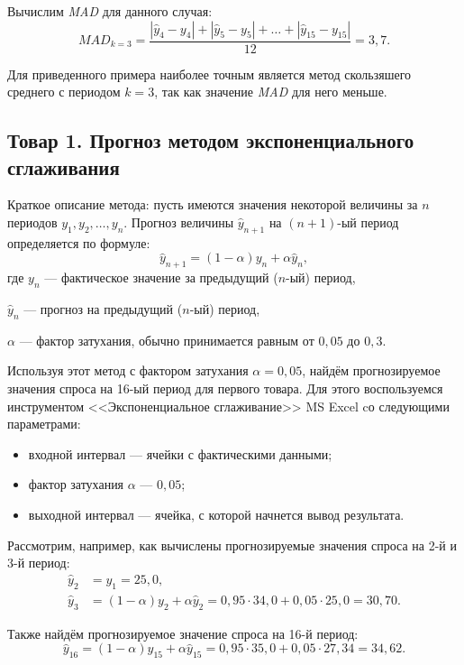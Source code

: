 Вычислим \textit{MAD} для данного случая:
\[
  MAD_{k=3} = \dfrac{|\hat{y}_4 - y_4| + |\hat{y}_5 - y_5| + \dots + |\hat{y}_{15} - y_{15}|}{12} = 3{,}7.
\]

Для приведенного примера наиболее точным является метод скользяшего среднего
с периодом $k = 3$, так как значение \textit{MAD} для него меньше.


\subsection{Товар 1. Прогноз методом экспоненциального сглаживания}

Краткое описание метода: пусть имеются значения некоторой
величины за $n$ периодов $y_1, y_2, \dots, y_n$.
Прогноз величины $\hat{y}_{n+1}$ на $(n+1)\text{-ый}$ период определяется по формуле:
\[
  \hat{y}_{n+1} = (1 - \alpha) y_n + \alpha \hat{y}_n,
\]
где \hspace{2mm} $y_n$ --- фактическое значение за предыдущий ($n$-ый) период, \par
                 $\hat{y}_n$ --- прогноз на предыдущий ($n$-ый) период, \par
                 $\alpha$ --- фактор затухания, обычно принимается равным от $0{,}05$ до $0{,}3$.

Используя этот метод с фактором затухания $\alpha = 0{,}05$,
найдём прогнозируемое значения спроса на 16-ый период
для первого товара. Для этого воспользуемся инструментом
<<Экспоненциальное сглаживание>> MS Excel cо следующими параметрами:
\begin{itemize}
  \item входной интервал --- ячейки с фактическими данными;
  \item фактор затухания $\alpha$ --- $0{,}05$;
  \item выходной интервал --- ячейка, с которой начнется вывод результата.
\end{itemize}

Рассмотрим, например, как вычислены прогнозируемые значения спроса на 2-й и 3-й период:
\begin{align*}
  \hat{y}_2 &= y_1 = 25{,}0, \\
  \hat{y}_3 &= (1 - \alpha) y_2 + \alpha \hat{y}_2 = 0{,}95 \cdot 34{,}0 + 0{,}05 \cdot 25{,}0 = 30{,}70.
\end{align*}

Также найдём прогнозируемое значение спроса на 16-й период:
\begin{equation*}
  \hat{y}_{16} = (1 - \alpha) y_{15} + \alpha \hat{y}_{15}  = 0{,}95 \cdot 35{,}0 + 0{,}05 \cdot 27{,}34 = 34{,}62.
\end{equation*}

